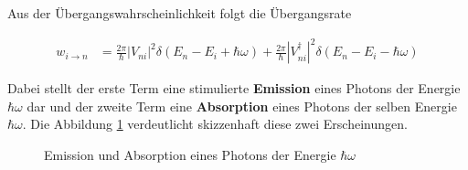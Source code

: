 Aus der Übergangswahrscheinlichkeit folgt die Übergangsrate

\begin{align}
  \label{eq:53}
  w_{i\rightarrow n} &= \frac{2\pi}{\hbar}|V_{ni}|^2 \delta(E_n - E_i + \hbar\omega ) + \frac{2\pi}{\hbar}|V_{ni}^\dagger|^2 \delta(E_n - E_i - \hbar\omega)
\end{align}

Dabei stellt der erste Term eine stimulierte \textbf{Emission} eines Photons der Energie \(\hbar \omega\) dar und der zweite Term eine \textbf{Absorption} eines Photons der selben Energie \(\hbar\omega\). Die Abbildung \ref{fig:3} verdeutlicht skizzenhaft diese zwei Erscheinungen.

\begin{figure}[!thb]
  \centering
  
  \caption{Emission und Absorption eines Photons der Energie \(\hbar\omega\)}
 \label{fig:3}
\end{figure}










